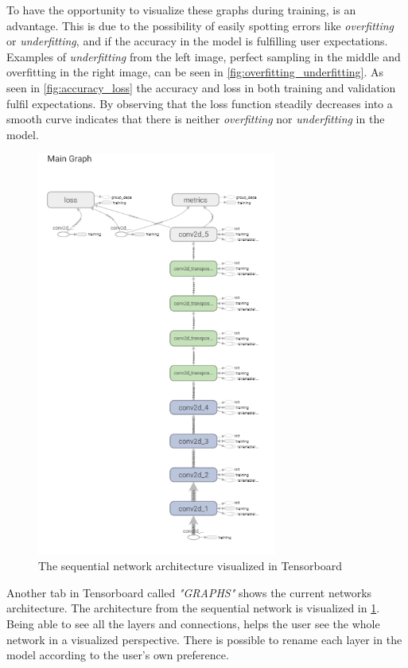 \documentclass[USenglish]{ifimaster}  %
\begin{document}
To have the opportunity to visualize these graphs during training, is an advantage. This is due to the possibility of easily spotting errors like \textit{overfitting} or \textit{underfitting}, and if the accuracy in the model is fulfilling user expectations. Examples of \textit{underfitting} from the left image, perfect sampling in the middle and overfitting in the right image, can be seen in \cref{fig:overfitting_underfitting}. As seen in \cref{fig:accuracy_loss} the accuracy and loss in both training and validation fulfil expectations. 
By observing that the loss function steadily decreases into a smooth curve indicates that there is neither \textit{overfitting} nor \textit{underfitting} in the model.

\begin{figure}[ht]
\centering
\includegraphics[width=0.7\textwidth]{bilder/tensorboard_graph_1.PNG}
\caption{The sequential network architecture visualized in Tensorboard}
\label{fig:graph}
\end{figure}

Another tab in Tensorboard called \textit{"GRAPHS"} shows the current networks architecture. The architecture from the sequential network is visualized in \cref{fig:graph}. Being able to see all the layers and connections, helps the user see the whole network in a visualized perspective. There is possible to rename each layer in the model according to the user's own preference. 
\end{document}
